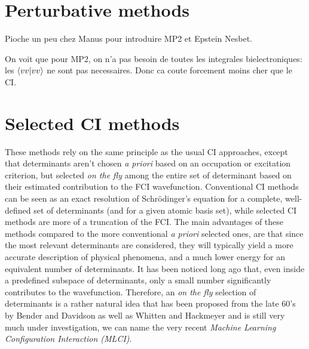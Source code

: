 \documentclass[./thesis.tex]{subfiles}
\begin{document}
\section{Perturbative methods}


\alert{Pioche un peu chez Manus pour introduire MP2 et Epstein Nesbet.}



\alert{On voit que pour MP2, on n'a pas besoin de toutes les integrales
bielectroniques: les $\braket{vv}{vv}$ ne sont pas necessaires. Donc ca coute
forcement moins cher que le CI.}

\section{Selected CI methods}

These methods rely on the same principle as the usual CI approaches, except that determinants aren't chosen \textit{a priori} based on an occupation or excitation criterion, but selected \emph{on the fly} among the entire set of determinant based on their estimated contribution to the FCI wavefunction. Conventional CI methods can be seen as an exact resolution of Schrödinger's equation for a complete, well-defined set of determinants (and for a given atomic basis set), while selected CI methods are more of a truncation of the FCI.
The main advantages of these methods compared to the more conventional \textit{a priori} selected ones, are that since the most relevant determinants are considered, they will typically yield a more accurate description of physical phenomena, and a much lower energy for an equivalent number of determinants.
It has been noticed long ago that, even inside a predefined subspace of determinants, only a small number significantly contributes to the wavefunction. Therefore, an \emph{on the fly} selection of determinants is a rather natural idea that has been proposed from the late 60's by Bender and Davidson\cite{Bender_1969} as well as Whitten and Hackmeyer\cite{Whitten_1969} and is still very much under investigation, we can name the very recent \emph{Machine Learning Configuration Interaction (MLCI)}.\cite{1808.05787}
\end{document}
